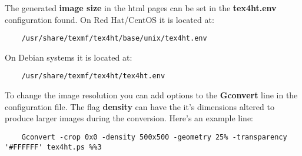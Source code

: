 \documentclass[12pt]{article}
\begin{document}
The generated {\bf image size} in the html pages can be set in the {\bf tex4ht.env} configuration found. On Red Hat/CentOS it is located at:

\begin{verbatim}
	/usr/share/texmf/tex4ht/base/unix/tex4ht.env
\end{verbatim}

On Debian systems it is located at:

\begin{verbatim}
	/usr/share/texmf/tex4ht/tex4ht.env
\end{verbatim}

To change the image resolution you can add options to the {\bf Gconvert} line in the configuration file. The flag {\bf density} can have the it's dimensions altered to produce larger images during the conversion. Here's an example line:

\begin{verbatim}
	Gconvert -crop 0x0 -density 500x500 -geometry 25% -transparency  '#FFFFFF' tex4ht.ps %%3
\end{verbatim}
\end{document}
